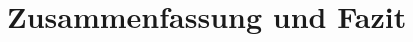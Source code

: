 \documentclass[../../Bachelorarbeit.tex]{subfiles}
\begin{document}
\section{Zusammenfassung und Fazit}
\blindtext[1]
\end{document}
